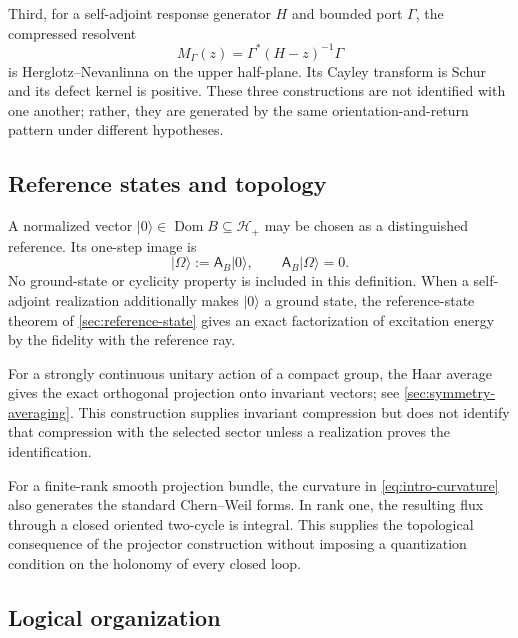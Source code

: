 \documentclass[11pt,reqno]{scrartcl}
\newcommand{\scrHp}{\mathscr H_{+}}
\newcommand{\Aop}{\mathsf A}
\newcommand{\ket}[1]{\lvert #1\rangle}
\DeclareMathOperator{\Dom}{Dom}
\theoremstyle{plain}
\theoremstyle{definition}
\theoremstyle{remark}
\begin{document}
Third, for a self-adjoint response generator \(H\) and bounded port
\(\Gamma\), the compressed resolvent
\begin{equation}
  M_\Gamma(z)=\Gamma^*(H-z)^{-1}\Gamma
  \label{eq:intro-response}
\end{equation}
is Herglotz--Nevanlinna on the upper half-plane.  Its Cayley transform is
Schur and its defect kernel is positive.  These three constructions are not
identified with one another; rather, they are generated by the same
orientation-and-return pattern under different hypotheses.

\subsection{Reference states and topology}

A normalized vector \(\ket0\in\Dom B\subseteq\scrHp\) may be chosen as a
distinguished
reference.  Its one-step image is
\begin{equation}
  \ket\Omega:=\Aop_B\ket0,
  \qquad
  \Aop_B\ket\Omega=0.
  \label{eq:intro-reference-image}
\end{equation}
No ground-state or cyclicity property is included in this definition.  When a
self-adjoint realization additionally makes \(\ket0\) a ground state, the
reference-state theorem of \cref{sec:reference-state} gives an exact
factorization of excitation energy by the fidelity with the reference ray.

For a strongly continuous unitary action of a compact group, the Haar
average gives the exact orthogonal projection onto invariant vectors; see
\cref{sec:symmetry-averaging}.  This construction supplies invariant
compression but does not identify that compression with the selected sector
unless a realization proves the identification.

For a finite-rank smooth projection bundle, the curvature in
\eqref{eq:intro-curvature} also generates the standard Chern--Weil forms.  In
rank one, the resulting flux through a closed oriented two-cycle is integral.
This supplies the topological consequence of the projector construction
without imposing a quantization condition on the holonomy of every closed
loop.

\subsection{Logical organization}
\end{document}
